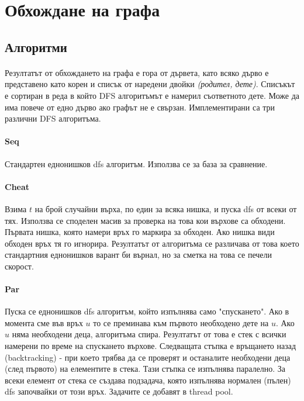 \section{Обхождане на графа}

\subsection{Алгоритми}

\paragraph*{} Резултатът от обхождането на графа е гора от дървета, като всяко дърво е представено като корен и списък от наредени двойки \textit{(родител, дете)}. Списъкът е сортиран в реда в който DFS алгоритъмът е намерил съответното дете. Може да има повече от едно дърво ако графът не е свързан. Имплементирани са три различни DFS алгоритъма.

\paragraph*{Seq} Стандартен еднонишков dfs алгоритъм. Използва се за база за сравнение.

\paragraph*{Cheat} Взима $t$ на брой случайни върха, по един за всяка нишка, и пуска dfs от всеки от тях. Използва се споделен масив за проверка на това кои върхове са обходени. Първата нишка, която намери връх го маркира за обходен. Ако нишка види обходен връх тя го игнорира. Резултатът от алгоритъма се различава от това което стандартния еднонишков варант би върнал, но за сметка на това се печели скорост.

\paragraph*{Par} Пуска се еднонишков dfs алгоритъм, който изпълнява само "спускането". Ако в момента сме във връх $u$  то се преминава към първото необходено дете на $u$. Ако $u$ няма необходени деца, алгоритъма спира. Резултатът от това е стек с всички намерени по време на спускането върхове. Следващата стъпка е връщането назад (backtracking) - при което трябва да се проверят и останалите необходени деца (след първото) на елементите в стека. Тази стъпка се изпълнява паралелно. За всеки елемент от стека се създава подзадача, която изпълнява нормален (пълен) dfs започвайки от този връх. Задачите се добавят в thread pool.

